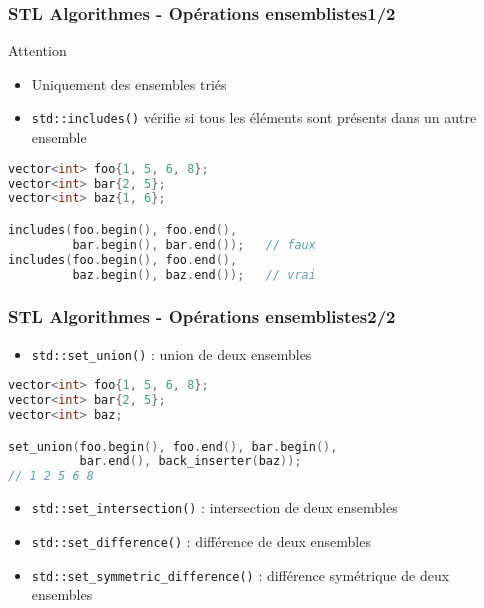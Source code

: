 \documentclass[C++.tex]{subfiles}
\begin{document}
\begin{frame}[fragile]
	\frametitle{STL Algorithmes - Opérations ensemblistes\titlehfill{}1/2}
	\begin{alertblock}{Attention}
		\begin{itemize}
			\item Uniquement des ensembles triés
		\end{itemize}
	\end{alertblock}
		
	\begin{itemize}
		\item \lstinline|std::includes()| vérifie si tous les éléments sont présents dans un autre ensemble

	\end{itemize}

	\begin{lstlisting}[language=C++]
vector<int> foo{1, 5, 6, 8};
vector<int> bar{2, 5};
vector<int> baz{1, 6};

includes(foo.begin(), foo.end(), 
         bar.begin(), bar.end());   // faux
includes(foo.begin(), foo.end(), 
         baz.begin(), baz.end());   // vrai\end{lstlisting}
\end{frame}

\begin{frame}[fragile]
	\frametitle{STL Algorithmes - Opérations ensemblistes\titlehfill{}2/2}
	\begin{itemize}
		\item \lstinline|std::set_union()| : union de deux ensembles
	\end{itemize}

	\begin{lstlisting}[language=C++]
vector<int> foo{1, 5, 6, 8};
vector<int> bar{2, 5};
vector<int> baz;

set_union(foo.begin(), foo.end(), bar.begin(),
          bar.end(), back_inserter(baz));
// 1 2 5 6 8\end{lstlisting}

	\begin{itemize}
		\item \lstinline|std::set_intersection()| : intersection de deux ensembles
		\item \lstinline|std::set_difference()| : différence de deux ensembles
		\item \lstinline|std::set_symmetric_difference()| : différence symétrique de deux ensembles

	\end{itemize}
\end{frame}
\end{document}
